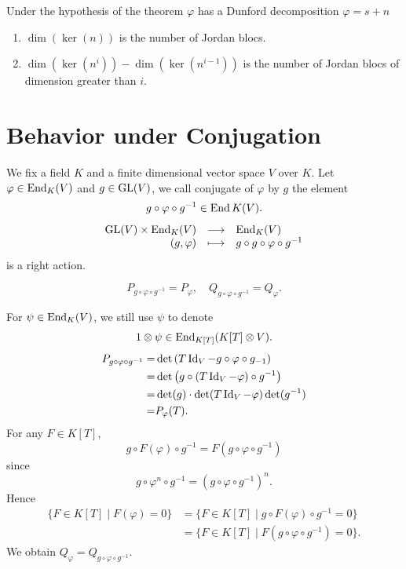 \begin{remark}
    Under the hypothesis of the theorem $\varphi$ has a Dunford decomposition $\varphi = s + n$
    \begin{enumerate}[label = (\arabic*)]
        \item $\dim(\ker(n))$ is the number of Jordan blocs.
        \item $\dim(\ker(n^i)) - \dim(\ker(n^{i-1}))$ is the number of Jordan blocs of dimension greater than $i$.
    \end{enumerate}
\end{remark}


\section{Behavior under Conjugation}


We fix a field $K$ and a finite dimensional vector space $V$ over $K$.
Let $\varphi \in \operatorname{\mathrm{End}}_{K}(V)$ and $g \in \operatorname{\mathrm{GL}}(V)$, we call conjugate of $\varphi$ by $g$ the element
$$g \circ \varphi \circ g^{-1} \in \operatorname{\mathrm{End}}{K}(V).$$
$$\begin{array}{rcl}
    \operatorname{\mathrm{GL}}(V) \times \operatorname{\mathrm{End}}_{K}(V) & \longrightarrow & \operatorname{\mathrm{End}}_{K}(V)\\
    (g,\varphi) & \longmapsto & g \circ g \circ \varphi \circ g^{-1}
\end{array}$$
is a right action.

\begin{theoremenv}
    $$P_{g \circ \varphi \circ g^{-1}} = P_{\varphi}, \quad Q_{g \circ \varphi \circ g^{-1}} = Q_{\varphi}.$$
\end{theoremenv}
\begin{proofenv}
    For $\psi \in \operatorname{\mathrm{End}}_{K}(V)$, we still use $\psi$ to denote
    $$1 \otimes \psi \in \operatorname{\mathrm{End}}_{K[T]}(K[T]\otimes V).$$
    $$\begin{aligned}
        P_{g \circ \varphi \circ g^{-1}} = & \det \left(T \operatorname{\mathrm{Id}}_{V} - g \circ \varphi \circ g_{-1}\right)\\
        = & \det\left(g \circ (T \operatorname{\mathrm{Id}}_{V} - \varphi) \circ g^{-1}\right)\\
        = & \det(g) \cdot \det(T \operatorname{\mathrm{Id}}_{V} - \varphi) \det(g^{-1})\\
        = & P_{\varphi} (T).
    \end{aligned}$$
    For any $F \in K[T]$,
    $$g \circ F(\varphi) \circ g^{-1} = F(g \circ \varphi \circ g^{-1})$$
    since 
    $$g \circ \varphi^n \circ g^{-1} = (g \circ \varphi \circ g^{-1})^n.$$
    Hence
    $$\begin{aligned}
        \{F \in K[T] \mid F(\varphi) = 0\} & = \{F \in K[T] \mid g \circ F(\varphi) \circ g^{-1} = 0\}\\
        & = \{F \in K[T] \mid F(g \circ \varphi \circ g^{-1}) = 0\}.
    \end{aligned}$$
    We obtain $Q_{\varphi} = Q_{g \circ \varphi \circ g^{-1}}$.
\end{proofenv}

